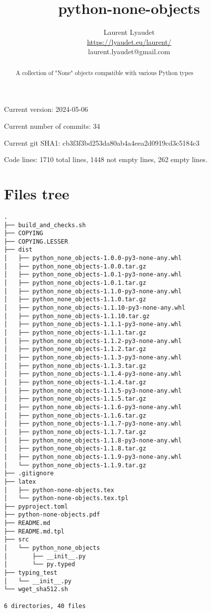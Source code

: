\documentclass{article}
\begin{document}
\author{
  Laurent Lyaudet\\
  \url{https://lyaudet.eu/laurent/}\\
  laurent.lyaudet@gmail.com
}
\title{python-none-objects}

\maketitle
\begin{abstract}
A collection of "None" objects
compatible with various Python types
\end{abstract}

Current version: 2024-05-06

Current number of commits: 34

Current git SHA1: cb3f3f3bd253da80ab4a4eea2d0919cd3c5184c3

Code lines: 1710 total lines, 1448 not empty lines, 262 empty lines.

\section{Files tree}
\label{section:tree}

\begin{verbatim}
.
├── build_and_checks.sh
├── COPYING
├── COPYING.LESSER
├── dist
│   ├── python_none_objects-1.0.0-py3-none-any.whl
│   ├── python_none_objects-1.0.0.tar.gz
│   ├── python_none_objects-1.0.1-py3-none-any.whl
│   ├── python_none_objects-1.0.1.tar.gz
│   ├── python_none_objects-1.1.0-py3-none-any.whl
│   ├── python_none_objects-1.1.0.tar.gz
│   ├── python_none_objects-1.1.10-py3-none-any.whl
│   ├── python_none_objects-1.1.10.tar.gz
│   ├── python_none_objects-1.1.1-py3-none-any.whl
│   ├── python_none_objects-1.1.1.tar.gz
│   ├── python_none_objects-1.1.2-py3-none-any.whl
│   ├── python_none_objects-1.1.2.tar.gz
│   ├── python_none_objects-1.1.3-py3-none-any.whl
│   ├── python_none_objects-1.1.3.tar.gz
│   ├── python_none_objects-1.1.4-py3-none-any.whl
│   ├── python_none_objects-1.1.4.tar.gz
│   ├── python_none_objects-1.1.5-py3-none-any.whl
│   ├── python_none_objects-1.1.5.tar.gz
│   ├── python_none_objects-1.1.6-py3-none-any.whl
│   ├── python_none_objects-1.1.6.tar.gz
│   ├── python_none_objects-1.1.7-py3-none-any.whl
│   ├── python_none_objects-1.1.7.tar.gz
│   ├── python_none_objects-1.1.8-py3-none-any.whl
│   ├── python_none_objects-1.1.8.tar.gz
│   ├── python_none_objects-1.1.9-py3-none-any.whl
│   └── python_none_objects-1.1.9.tar.gz
├── .gitignore
├── latex
│   ├── python-none-objects.tex
│   └── python-none-objects.tex.tpl
├── pyproject.toml
├── python-none-objects.pdf
├── README.md
├── README.md.tpl
├── src
│   └── python_none_objects
│       ├── __init__.py
│       └── py.typed
├── typing_test
│   └── __init__.py
└── wget_sha512.sh

6 directories, 40 files
\end{verbatim}
\end{document}
